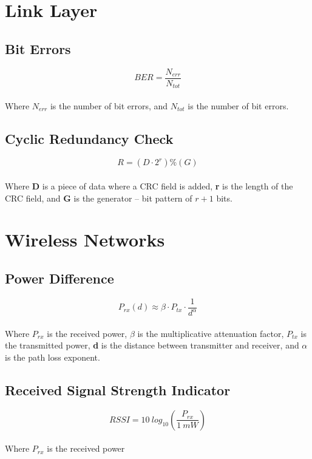 \documentclass{article}
\begin{document}
\section{Link Layer}
\subsection{Bit Errors}
\vspace{.3cm}
\[ BER = \frac{N_{err}}{N_{tot}} \] \\
Where $N_{err}$ is the number of bit errors, and $N_{tot}$ is the number of bit errors.

\subsection{Cyclic Redundancy Check}
\vspace{.3cm}
\[ R = (D \cdot 2^r) \% (G) \] \\
Where \textbf{D} is a piece of data where a CRC field is added, \textbf{r} is the length of the CRC field, and \textbf{G} is the generator -- bit pattern of $r + 1$ bits.

\section{Wireless Networks}
\subsection{Power Difference}
\vspace{.3cm}
\[ P_{rx}(d) \approx \beta \cdot P_{tx} \cdot \frac{1}{d^\alpha} \] \\
Where $P_{rx}$ is the received power, $\beta$ is the multiplicative attenuation factor, $P_{tx}$ is the transmitted power, \textbf{d} is the distance between transmitter and receiver, and $\alpha$ is the path loss exponent.

\subsection{Received Signal Strength Indicator}
\vspace{.3cm}
\[ RSSI = 10~log_{10}\left(\frac{P_{rx}}{1~mW}\right) \] \\
Where $P_{rx}$ is the received power
\end{document}
